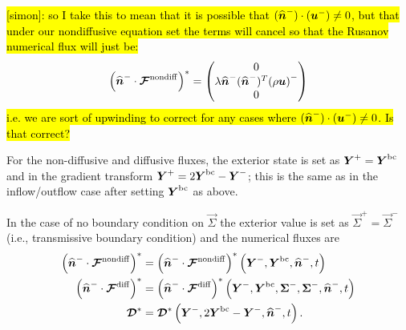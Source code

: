 \documentclass{report}
\begin{document}
\hl{[simon]: so I take this to mean that it is possible that $(\nhat^{-}) \cdot (\vec{u}^{-}) \neq 0 $, but that under our nondiffusive equation set the terms will cancel so that the Rusanov numerical flux will just be:}
\begin{align}
  \left( \nhat^{-} \cdot \Fnondiff\right)^{*} =
  \begin{pmatrix}
    0\\
    \lambda \nhat^{-} (\nhat^{-})^{T}
    {\left(\rho \vec{u}\right)}^{-}\\
    0
  \end{pmatrix}
\end{align}
\hl{i.e. we are sort of upwinding to correct for any cases where 
$(\nhat^{-}) \cdot (\vec{u}^{-}) \neq 0 $. Is that correct?}

For the non-diffusive and diffusive fluxes, the exterior state is set as
$\vec{Y}^{+} = \vec{Y}^{\rm bc}$ and in the gradient transform 
$\vec{Y}^{+} = 2\vec{Y}^{\rm bc} - \vec{Y}^{-}$; this is the same as in the
inflow/outflow case after setting $\vec{Y}^{\rm bc}$ as above.


In the case of no boundary condition on $\vec{\Sigma}$ the exterior value is set
as $\vec{\Sigma}^{+} = \vec{\Sigma}^{-}$ (i.e., transmissive boundary condition) and the numerical fluxes are
\begin{align}
  {\left( \nhat^{-} \cdot \Fnondiff\right)}^{*} &=
  {\left( \nhat^{-} \cdot \Fnondiff\right)}^{*}
  \left(\vec{Y}^{-}, \vec{Y}^{\rm bc}, \nhat^{-}, t\right)
  \label{eq:impermeable_bc/nondiff_flux1}\\
  {\left( \nhat^{-} \cdot \Fdiff\right)}^{*} &=
  {\left( \nhat^{-} \cdot \Fdiff\right)}^{*}
  \left(\vec{Y}^{-}, \vec{Y}^{\rm bc}, \vec{\Sigma}^{-}, \vec{\Sigma}^{-},
  \nhat^{-}, t\right)
  \label{eq:impermeable_bc/nondiff_flux2}\\
  \diffusive^{*} &=
  \diffusive^{*}
  \left(\vec{Y}^{-}, 2\vec{Y}^{\rm bc}-\vec{Y}^{-}, \nhat^{-}, t\right).
  \label{eq:impermeable_bc/nondiff_flux3}
\end{align}
\end{document}

